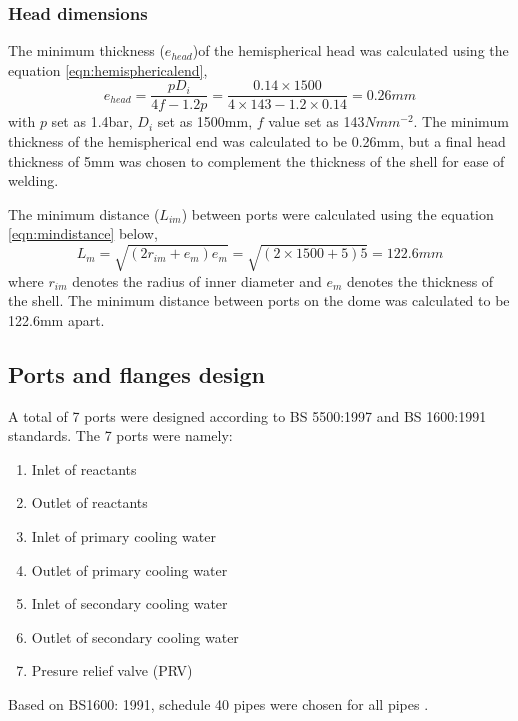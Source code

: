 \subsubsection{Head dimensions}
The minimum thickness ($e_{head}$)of the hemispherical head was calculated using the equation \ref{eqn:hemisphericalend},
\begin{equation}
    e_{head} = \frac{pD_i}{4f-1.2p} = \frac{0.14 \times 1500}{4 \times 143 - 1.2 \times 0.14} = 0.26mm
    \label{eqn:hemisphericalend}
\end{equation}
with $p$ set as 1.4bar, $D_i$ set as 1500mm, $f$ value set as 143$Nmm^{-2}$.  The minimum thickness of the hemispherical end was calculated to be 0.26mm, but a final head thickness of 5mm was chosen to complement the thickness of the shell for ease of welding. 

The minimum distance ($L_{im}$) between ports were calculated using the equation \ref{eqn:mindistance} below,
\begin{equation}
    L_m = \sqrt{(2r_{im}+e_{m})e_m} = \sqrt{(2 \times 1500 + 5)5} = 122.6mm
    \label{eqn:mindistance}
\end{equation}
where $r_{im}$ denotes the radius of inner diameter and $e_m$ denotes the thickness of the shell. The minimum distance between ports on the dome was calculated to be 122.6mm apart. 

\subsection{Ports and flanges design}
A total of 7 ports were designed according to BS 5500:1997 and BS 1600:1991 standards. The 7 ports were namely:
\begin{enumerate}
    \item Inlet of reactants
    \item Outlet of reactants
    \item Inlet of primary cooling water
    \item Outlet of primary cooling water
    \item Inlet of secondary cooling water
    \item Outlet of secondary cooling water
    \item Presure relief valve (PRV)
\end{enumerate}
Based on BS1600: 1991, schedule 40 pipes were chosen for all pipes \cite{noauthor_dimensions_nodate}. 
